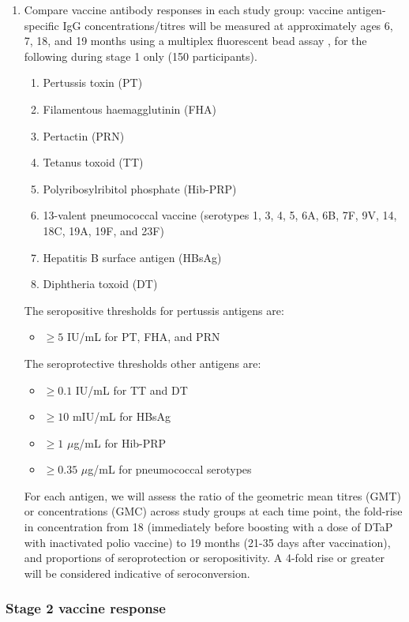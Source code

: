 \documentclass{bmcart}
\begin{document}
\begin{enumerate}[resume]
	\item Compare vaccine antibody responses in each study group:
	vaccine antigen-specific IgG concentrations/titres will be measured at approximately ages 6, 7, 18, and 19 months using a multiplex fluorescent bead assay \cite{van2008development}, for the following during stage 1 only (150 participants).
	\begin{enumerate}
		\item Pertussis toxin (PT)
		\item Filamentous haemagglutinin (FHA)
		\item Pertactin (PRN)
		\item Tetanus toxoid (TT)
		\item Polyribosylribitol phosphate (Hib-PRP)
		\item 13-valent pneumococcal vaccine (serotypes 1, 3, 4, 5, 6A, 6B, 7F, 9V, 14, 18C, 19A, 19F, and 23F)
		\item Hepatitis B surface antigen (HBsAg)
		\item Diphtheria toxoid (DT)
	\end{enumerate}
	The seropositive thresholds for pertussis antigens are:
	\begin{itemize}
	    \item $\geq 5$ IU/mL for PT, FHA, and PRN
	\end{itemize}
	The seroprotective thresholds other antigens are:
	\begin{itemize}
		\item $\geq 0.1$ IU/mL  for TT \cite{whotetanus} and DT
		\item $\geq 10$ mIU/mL for HBsAg
		\item $\geq 1$ $\mu$g/mL for Hib-PRP \cite{kayhty1983protective}
		\item $\geq 0.35$ $\mu$g/mL for pneumococcal serotypes \cite{siber2007estimating,whopneumo}
	\end{itemize}
	For each antigen, we will assess the ratio of the geometric mean titres (GMT) or concentrations (GMC) across study groups at each time point, the fold-rise in concentration from 18 (immediately before boosting with a dose of DTaP with inactivated polio vaccine) to 19 months (21-35 days after vaccination), and proportions of seroprotection or seropositivity.
	A 4-fold rise or greater will be considered indicative of seroconversion.
\end{enumerate}

\subsubsection*{Stage 2 vaccine response}
\end{document}
